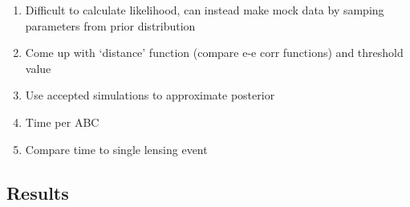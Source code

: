 \documentclass[%
 reprint,
 amsmath,amssymb,
 aps,nofootinbib
]{revtex4-1}
\begin{document}
\begin{enumerate}
\item Difficult to calculate likelihood, can instead make mock data by samping parameters from prior distribution
\item Come up with `distance' function (compare e-e corr functions) and threshold value
\item Use accepted simulations to approximate posterior
\item Time per ABC
\item Compare time to single lensing event
\end{enumerate}


\subsection{Results}




\end{document}
